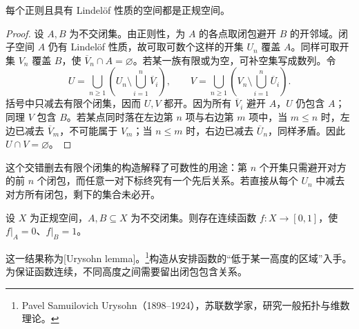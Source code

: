 \begin{lemma}\label{g1:lem:regular-lindelof-normal}
	每个正则且具有 Lindelöf 性质的空间都是正规空间。
\end{lemma}
\begin{proof}
	设 \(A,B\) 为不交闭集。由正则性，为 \(A\) 的各点取闭包避开 \(B\) 的开邻域。闭子空间 \(A\) 仍有 Lindelöf 性质，故可取可数个这样的开集 \(U_n\) 覆盖 \(A\)。同样可取开集 \(V_n\) 覆盖 \(B\)，使 \(\overline V_n\cap A=\varnothing\)。若某一族有限或为空，可补空集写成数列。令
	\[
		U=\bigcup_{n\ge1}\left(U_n\setminus\bigcup_{i=1}^n\overline V_i\right),
		\qquad
		V=\bigcup_{n\ge1}\left(V_n\setminus\bigcup_{i=1}^n\overline U_i\right).
	\]
	括号中只减去有限个闭集，因而 \(U,V\) 都开。因为所有 \(\overline V_i\) 避开 \(A\)，\(U\) 仍包含 \(A\)；同理 \(V\) 包含 \(B\)。若某点同时落在左边第 \(n\) 项与右边第 \(m\) 项中，当 \(m\le n\) 时，左边已减去 \(\overline V_m\)，不可能属于 \(V_m\)；当 \(n\le m\) 时，右边已减去 \(\overline U_n\)，同样矛盾。因此 \(U\cap V=\varnothing\)。
\end{proof}

这个交错删去有限个闭集的构造解释了可数性的用途：第 \(n\) 个开集只需避开对方的前 \(n\) 个闭包，而任意一对下标终究有一个先后关系。若直接从每个 \(U_n\) 中减去对方所有闭包，剩下的集合未必开。

\begin{lemma}[Urysohn 引理]\label{g1:lem:urysohn}
	设 \(X\) 为正规空间，\(A,B\subseteq X\) 为不交闭集。则存在连续函数 \(f:X\to[0,1]\)，使 \(f|_A=0\)、\(f|_B=1\)。
\end{lemma}

这一结果称为[Urysohn lemma]。\footnote{Pavel Samuilovich Urysohn（1898--1924），苏联数学家，研究一般拓扑与维数理论。}构造从安排函数的“低于某一高度的区域”入手。为保证函数连续，不同高度之间需要留出闭包包含关系。

